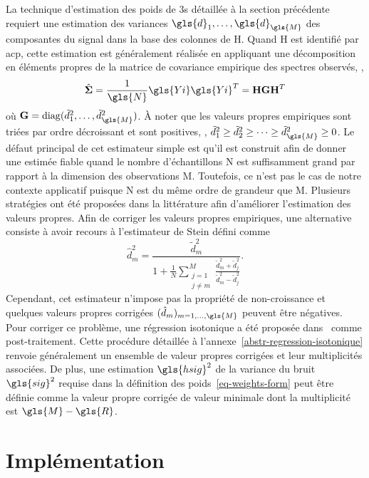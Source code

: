 La technique d'estimation des poids de \gls{3s} détaillée à la section précédente requiert une estimation des variances $\gls{d}_1,\dots,\gls{d}_{\gls{M}}$ des composantes du signal dans la base des colonnes de \gls{H}. Quand \gls{H} est identifié par \gls{acp}, cette estimation est généralement réalisée en appliquant une décomposition en éléments propres de la matrice de covariance empirique des spectres observés, \ie{},
\begin{equation}
    \hat{\boldsymbol\Sigma} = \frac{1}{\gls{N}}\gls{Yi}\gls{Yi}^T = \mathbf{H}\mathbf{G}\mathbf{H}^T
\end{equation}
où $\mathbf{G} = \mathrm{diag}(\tilde{d}_1^2, \dots, \tilde{d}_{\gls{M}}^2)$. \`A noter que les valeurs propres empiriques sont triées par ordre décroissant et sont positives, \ie{}, $\tilde{d}_1^2 \geq \tilde{d}_2^2 \geq \dots \geq \tilde{d}_{\gls{M}}^2\geq 0$. Le défaut principal de cet estimateur simple est qu'il est construit afin de donner une estimée fiable quand le nombre d'échantillons \gls{N} est suffisamment grand par rapport à la dimension des observations \gls{M}. Toutefois, ce n'est pas le cas de notre contexte applicatif puisque \gls{N} est du même ordre de grandeur que \gls{M}. Plusieurs stratégies ont été proposées dans la littérature afin d'améliorer l'estimation des valeurs propres. Afin de corriger les valeurs propres empiriques, une alternative consiste à avoir recours à l'estimateur de Stein défini comme~\cite{mestre2008improved}
\begin{equation}\label{eq-Stein-corr}
\hat{d}^2_m = 
\frac{\tilde{d}^2_m}{1+ \frac{1}{N}\sum_{\substack{j=1\\j\neq m }}^M \frac{\tilde{d}^2_m+\tilde{d}^2_j}{\tilde{d}^2_m-\tilde{d}^2_j}}.
\end{equation}
Cependant, cet estimateur n'impose pas la propriété de non-croissance et quelques valeurs propres corrigées $(\hat{d}_m)_{m=1,\dots,\gls{M}}$ peuvent être négatives. Pour corriger ce problème, une régression isotonique a été proposée dans~\cite{LinPerl1985} comme post-traitement. Cette procédure détaillée à l'annexe~\ref{abstr-regression-isotonique} renvoie généralement un ensemble de valeur propres corrigées et leur multiplicités associées. De plus, une estimation $\gls{hsig}^2$ de la variance du bruit $\gls{sig}^2$ requise dans la définition des poids~\eqref{eq-weights-form} peut être définie comme la valeur propre corrigée de valeur minimale dont la multiplicité est $\gls{M} - \gls{R}$.

%
\section{Implémentation}\label{ch-3-implementation}

